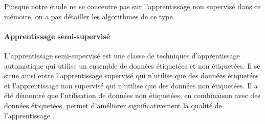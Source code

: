 Puisque notre étude ne se concentre pas sur l'apprentissage non supervisé dans ce mémoire, on a pas détailler les algorithmes de ce type.

\paragraph{Apprentissage semi-supervisé}
L'apprentissage semi-supervisé est une classe de techniques d'apprentissage automatique qui utilise un ensemble de données étiquetées et non étiquetées. Il se situe ainsi entre l'apprentissage supervisé qui n'utilise que des données étiquetées et l'apprentissage non supervisé qui n'utilise que des données non étiquetées. Il a été démontré que l'utilisation de données non étiquetées, en combinaison avec des données étiquetées, permet d'améliorer significativement la qualité de l'apprentissage .
    
